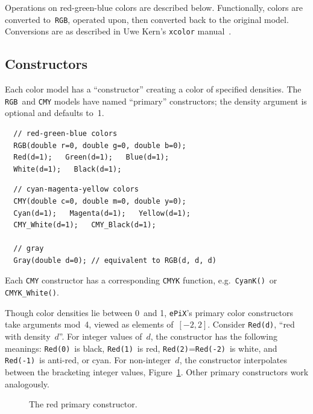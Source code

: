 \documentclass[12pt,letterpaper]{book}
\newcommand{\code}[1]{\texttt{#1}}
\newcommand{\filename}[1]{\texttt{#1}}
\newcommand{\ePiX}{\code{ePiX}}
\newcommand{\teximath}[1]{$#1$}
\newcommand{\findex}[1]{\ignorespaces}
\begin{document}
Operations on red-green-blue colors are described below. Functionally,
colors are converted to~\code{RGB}, operated upon, then converted back
to the original model. Conversions are as described in Uwe Kern's
\filename{xcolor} manual~\cite{xcolor}.


\subsection{Constructors}

Each color model has a ``constructor'' creating a color of specified
densities. The \code{RGB}~and \code{CMY} models have named ``primary''
constructors; the density argument is optional and defaults to~1.
\findex{RGB}
\findex{Red}
\findex{Green}
\findex{Blue}
\findex{White}
\findex{Black}
\begin{verbatim}
  // red-green-blue colors
  RGB(double r=0, double g=0, double b=0);
  Red(d=1);   Green(d=1);   Blue(d=1);
  White(d=1);   Black(d=1);
\end{verbatim}
\findex{CMY}
\findex{Cyan}
\findex{Magenta}
\findex{Yellow}
\findex{CMY\_White}
\findex{CMY\_Black}
\findex{CMYK}
\findex{Gray}
\begin{verbatim}
  // cyan-magenta-yellow colors
  CMY(double c=0, double m=0, double y=0);
  Cyan(d=1);   Magenta(d=1);   Yellow(d=1);
  CMY_White(d=1);   CMY_Black(d=1);

  // gray
  Gray(double d=0); // equivalent to RGB(d, d, d)
\end{verbatim}
Each \code{CMY} constructor has a corresponding \code{CMYK} function,
e.g.\ \code{CyanK()}~or \code{CMYK\_White()}.

%
Though color densities lie between 0~and 1, \ePiX's primary color
constructors take arguments mod~4, viewed as elements
of~\teximath{[-2,2]}. Consider \code{Red(d)}, ``red with
density~\teximath{d}''. For integer values of~\teximath{d}, the
constructor has the following meanings: \code{Red(0)}~is black,
\code{Red(1)}~is red, \code{Red(2)}=\code{Red(-2)}~is white, and
\code{Red(-1)}~is anti-red, or cyan. For non-integer~\teximath{d}, the
constructor interpolates between the bracketing integer values,
Figure~\ref{fig-densities}. Other primary constructors work
analogously.

\begin{figure}[hbt]
  \begin{center}
    
  \end{center}
  \caption{The red primary constructor.}
\label{fig-densities}
\end{figure}
\end{document}
